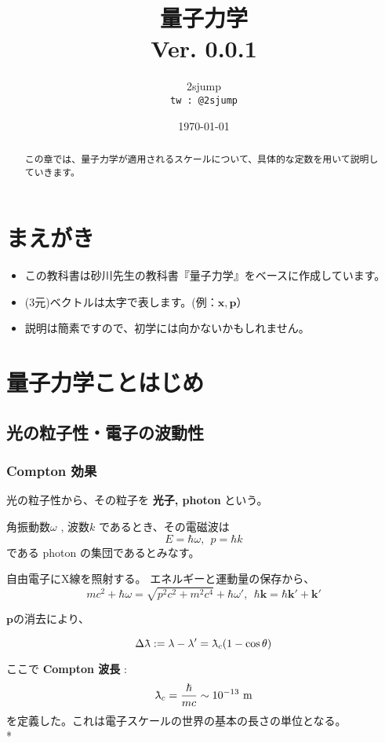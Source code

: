 \documentclass[a4j,10pt,oneside,openany]{jsbook}
\title{{\Huge \textbf{量子力学}}\\ {\small Ver. 0.0.1}}
\author{2sjump\\ \texttt{tw : @2sjump}}
\date{\today}
\newcommand{\lambdabar}{{\mkern0.75mu\mathchar '26\mkern -9.75mu\lambda}}
\begin{document}
\maketitle
\frontmatter
\tableofcontents
\mainmatter

\setcounter{chapter}{-1} %

\chapter{まえがき}
\begin{itemize}
	\item この教科書は砂川先生の教科書『量子力学』をベースに作成しています。
	\item (3元)ベクトルは太字で表します。(例：$\bm{x}, \bm{p}$）	 
	\item 説明は簡素ですので、初学には向かないかもしれません。
\end{itemize}

\chapter{量子力学ことはじめ}
\begin{abstract}
	この章では、量子力学が適用されるスケールについて、具体的な定数を用いて説明していきます。
\end{abstract}


\section{光の粒子性・電子の波動性}

\subsection{Compton 効果}
光の粒子性から、その粒子を  \textbf{光子, photon}  という。

角振動数$\omega$ , 波数$k$ であるとき、その電磁波は
\[
	E = \hbar \omega,\ \ p = \hbar k
\]
である photon の集団であるとみなす。

自由電子にX線を照射する。
エネルギーと運動量の保存から、
\[
	mc^2 + \hbar\omega = \sqrt{p^2c^2 + m^2c^4} + \hbar \omega',\ \ \hbar \bm{k} = \hbar \bm{k'} + \bm{k}'
\]

$\bm{p}$の消去により、

\[
	\Delta \lambdabar := \lambda - \lambda' = \lambdabar_c(1-\cos \theta)
\]

ここで \textbf{Compton 波長} :
\[
	\lambdabar_c = \frac{\hbar}{mc} \sim 10^{-13}\ \mathrm{m}
\]
を定義した。これは電子スケールの世界の基本の長さの単位となる。
\vspace{0.2in} \\*
\end{document}
